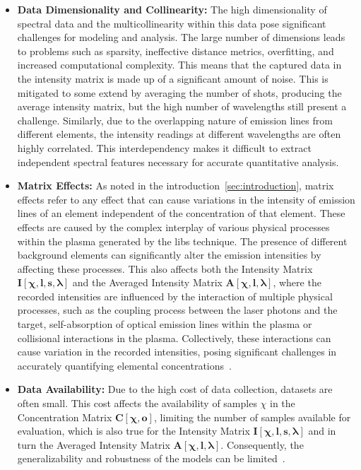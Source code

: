 \begin{itemize}
    \item \textbf{Data Dimensionality and Collinearity:} The high dimensionality of spectral data and the multicollinearity within this data pose significant challenges for modeling and analysis.
The large number of dimensions leads to problems such as sparsity, ineffective distance metrics, overfitting, and increased computational complexity. 
This means that the captured data in the intensity matrix is made up of a significant amount of noise. This is mitigated to some extend by averaging the number of shots, producing the average intensity matrix, but the high number of wavelengths still present a challenge.
Similarly, due to the overlapping nature of emission lines from different elements, the intensity readings at different wavelengths are often highly correlated. 
This interdependency makes it difficult to extract independent spectral features necessary for accurate quantitative analysis\cite{andersonImprovedAccuracyQuantitative2017}.

    \item \textbf{Matrix Effects:} As noted in the introduction~\ref{sec:introduction}, matrix effects refer to any effect that can cause variations in the intensity of emission lines of an element independent of the concentration of that element. 
    These effects are caused by the complex interplay of various physical processes within the plasma generated by the \gls{libs} technique. The presence of different background elements can significantly alter the emission intensities by affecting these processes.
    This also affects both the Intensity Matrix $\mathbf{I[\chi, l, s, \lambda]}$ and the Averaged Intensity Matrix $\mathbf{A[\chi, l, \lambda]}$, where the recorded intensities are influenced by the interaction of multiple physical processes, such as the coupling process between the laser photons and the target, self-absorption of optical emission lines within the plasma or collisional interactions in the plasma.
    Collectively, these interactions can cause variation in the recorded intensities, posing significant challenges in accurately quantifying elemental concentrations~\cite{cleggRecalibrationMarsScience2017, andersonImprovedAccuracyQuantitative2017}.
    
    \item \textbf{Data Availability:} Due to the high cost of data collection, datasets are often small. 
    This cost affects the availability of samples $\chi$ in the Concentration Matrix $\mathbf{C[\chi, o]}$, limiting the number of samples available for evaluation, which is also true for the Intensity Matrix $\mathbf{I[\chi, l, s, \lambda]}$ and in turn the Averaged Intensity Matrix $\mathbf{A[\chi, l, \lambda]}$. 
    Consequently, the generalizability and robustness of the models can be limited~\cite{p9_paper}.
\end{itemize}

